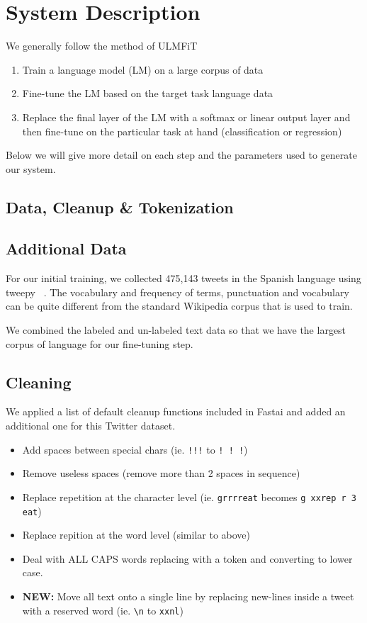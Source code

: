 \section{System Description}
\label{sec:system}

We generally follow the method of ULMFiT ~\cite{DBLP:journals/corr/abs-1801-06146}
\begin{enumerate}
	\item Train a language model (LM) on a large corpus of data
	\item Fine-tune the LM based on the target task language data
	\item Replace the final layer of the LM with a softmax or linear output layer and then fine-tune on the particular task at hand (classification or regression)
\end{enumerate}
Below we will give more detail on each step and the parameters used to generate our system.
\subsection{Data, Cleanup \& Tokenization}
\label{sec:datacleaning}
\subsection{Additional Data}
For our initial training, we  collected 475,143 tweets in the Spanish language using tweepy ~\cite{tweepy}.  The vocabulary and frequency of terms, punctuation and vocabulary can be quite different from the standard Wikipedia corpus that is used to train.

We combined the labeled and un-labeled text data so that we have the largest corpus of language for our fine-tuning step. 

\subsection{Cleaning}
We applied a list of default cleanup functions included in Fastai and added an additional one for this Twitter dataset.
\begin{itemize}
	\item Add spaces between special chars (ie. \verb|!!!| to \verb|! ! !|)
	\item Remove useless spaces (remove more than 2 spaces in sequence)
	\item Replace repetition at the character level (ie. \verb|grrrreat| becomes \verb|g xxrep r 3 eat|)
	\item Replace repition at the word level (similar to above)
	\item Deal with ALL CAPS words replacing with a token and converting to lower case.
	\item \textbf{NEW:} Move all text onto a single line by replacing new-lines inside a tweet with a reserved word (ie. \verb|\n| to \verb|xxnl|)
\end{itemize} 

